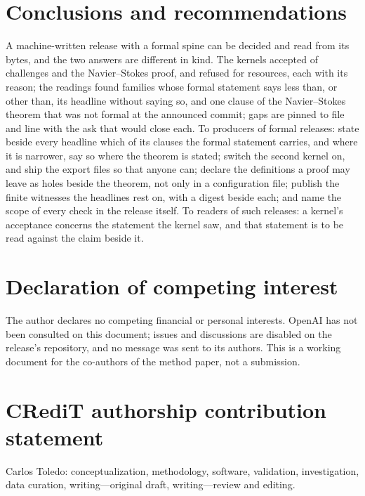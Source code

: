 \documentclass[preprint,11pt,authoryear,a4paper]{elsarticle}
\begin{document}
\section{Conclusions and recommendations}\label{sec:conclusions}
A machine-written release with a formal spine can be decided and read from its bytes, and the two answers are different in kind. The kernels accepted \MtOaCertified{} of \MtOaChallenges{} challenges and the Navier--Stokes proof, and refused \MtOaRefused{} for resources, each with its reason; the readings found \MtOaShort{} families whose formal statement says less than, or other than, its headline without saying so, and one clause of the Navier--Stokes theorem that was not formal at the announced commit; \MtOaGaps{} gaps are pinned to file and line with the ask that would close each. To producers of formal releases: state beside every headline which of its clauses the formal statement carries, and where it is narrower, say so where the theorem is stated; switch the second kernel on, and ship the export files so that anyone can; declare the definitions a proof may leave as holes beside the theorem, not only in a configuration file; publish the finite witnesses the headlines rest on, with a digest beside each; and name the scope of every check in the release itself. To readers of such releases: a kernel's acceptance concerns the statement the kernel saw, and that statement is to be read against the claim beside it.

\section*{Declaration of competing interest}
The author declares no competing financial or personal interests. OpenAI has not been consulted on this document; issues and discussions are disabled on the release's repository, and no message was sent to its authors. This is a working document for the co-authors of the method paper, not a submission.

\section*{CRediT authorship contribution statement}
Carlos Toledo: conceptualization, methodology, software, validation, investigation, data curation, writing---original draft, writing---review and editing.
\end{document}
